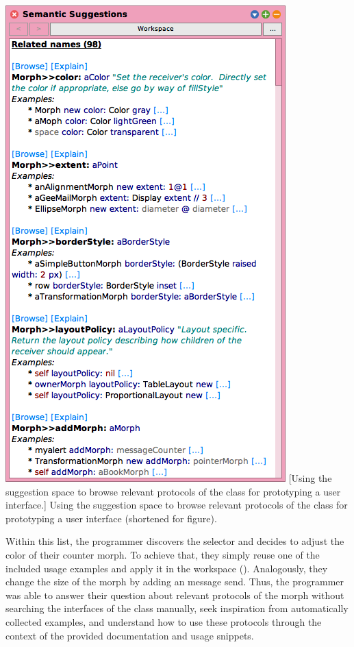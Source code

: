 \addvspace{\parskip}
\noindent
\begin{minipage}{\textwidth}
	\centering
	\includegraphics[height=28\baselineskip]{01_suggestions/suggestion_space.png} %
	[Using the suggestion space to browse relevant protocols of the class  for prototyping a user interface.]{
		Using the suggestion space to browse relevant protocols of the class  for prototyping a user interface (shortened for figure).
	}
\end{minipage}

Within this list, the programmer discovers the  selector and decides to adjust the color of their counter morph.
To achieve that, they simply reuse one of the included usage examples and apply it in the workspace ().
Analogously, they change the size of the morph by adding an  message send.
Thus, the programmer was able to answer their question about relevant protocols of the morph without searching the interfaces of the  class manually, seek inspiration from automatically collected examples, and understand how to use these protocols through the context of the provided documentation and usage snippets.

